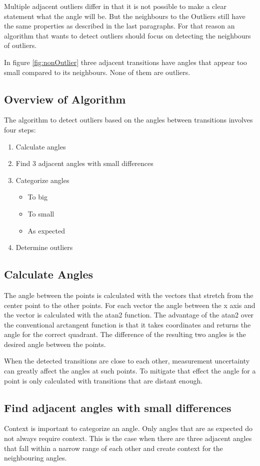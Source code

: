 Multiple adjacent outliers differ in that it is not possible to make a clear statement what the angle will be. But the neighbours to the Outliers still have the same properties as described in the last paragraphs. For that reason an algorithm that wants to detect outliers should focus on detecting the neighbours of outliers.

In figure \ref{fig:nonOutlier} three adjacent transitions have angles that appear too small compared to its neighbours. None of them are outliers.

\subsection{Overview of Algorithm}
\label{sec:descriptionOfAngleValidation}

The algorithm to detect outliers based on the angles between transitions involves four steps:

\begin{enumerate}
	\item Calculate angles
	\item Find 3 adjacent angles with small differences
	\item Categorize angles
	\begin{itemize}
		\item To big
		\item To small
		\item As expected 
	\end{itemize}
	\item Determine outliers
\end{enumerate}
\subsection{Calculate Angles}
\label{sec:calculateAngles}
The angle between the points is calculated with the vectors that stretch from the center point to the other points. For each vector the angle between the x axis and the vector is calculated with the atan2 function. The advantage of the atan2 over the conventional arctangent function is that it takes coordinates and returns the angle for the correct quadrant. The difference of the resulting two angles is the desired angle between the points. 

When the detected transitions are close to each other, measurement uncertainty can greatly affect the angles at such points. To mitigate that effect the angle for a point is only calculated with transitions that are distant enough.
\subsection{Find adjacent angles with small differences}
Context is important to categorize an angle. Only angles that are as expected do not always require context. This is the case when there are three adjacent angles that fall within a narrow range of each other and create context for the neighbouring angles.

